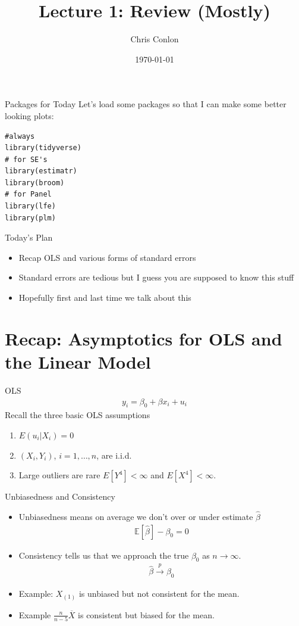 \documentclass[aspectratio=169]{beamer}
\title{Lecture 1: Review (Mostly)}
\author{Chris Conlon }
\institute{NYU Stern }
\date{\today}
\newcommand{\E}{\mathbb{E}}
\begin{document}
\maketitle

\begin{frame}[fragile]{Packages for Today}
Let's load some packages so that I can make some better looking plots:\\
\begin{verbatim}
#always
library(tidyverse)
# for SE's
library(estimatr)
library(broom)
# for Panel
library(lfe)
library(plm)
\end{verbatim}
\end{frame}


\begin{frame}{Today's Plan}
\begin{itemize}
\item Recap OLS and various forms of standard errors
\item Standard errors are tedious but I guess you are supposed to know this stuff
\item Hopefully first and last time we talk about this
\end{itemize}
\end{frame}


\section{Recap: Asymptotics for OLS and the Linear Model}


\begin{frame}{OLS}
\begin{align*}
y_i = \beta_0 + \beta x_i + u_i
\end{align*}
Recall the three basic OLS assumptions
\begin{enumerate}
\item $E(u_i |X_i ) = 0$
\item $(X_i,Y_i)$, $i =1,\ldots,n$, are i.i.d.
\item Large outliers are rare $E[Y^4]< \infty$ and $E[X^4]<\infty$.
\end{enumerate}
\end{frame}

\begin{frame}{Unbiasedness and Consistency}
\begin{itemize}
\item Unbiasedness means on average we don't over or under estimate $\widehat{\beta}$
\begin{align*}
\E[\widehat{\beta} ] - \beta_0 = 0
\end{align*}
\item Consistency tells us that we approach the true $\beta_0$ as $n \rightarrow \infty$.
\begin{align*}
\widehat{\beta}  \overset{p}{\to} \beta_0
\end{align*}
\item Example: $X_{(1)}$ is unbiased but not consistent for the mean.
\item Example $\frac{n}{n-5} \overline{X}$ is consistent but biased for the mean.
\end{itemize}
\end{frame}
\end{document}
